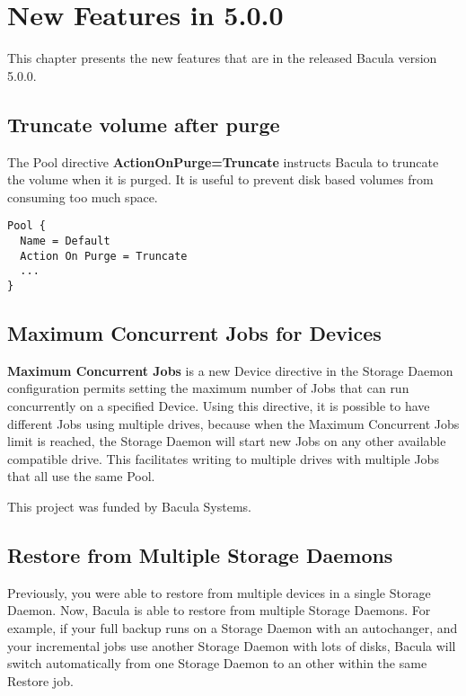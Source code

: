 \chapter{New Features in 5.0.0}
\label{NewFeaturesChapter}

This chapter presents the new features that are in the
released Bacula version 5.0.0.

\section{Truncate volume after purge}
\label{sec:actiononpurge}

The Pool directive \textbf{ActionOnPurge=Truncate} instructs Bacula to truncate
the volume when it is purged. It is useful to prevent disk based volumes from
consuming too much space. 

\begin{verbatim}
Pool {
  Name = Default
  Action On Purge = Truncate
  ...
}
\end{verbatim}

\section{Maximum Concurrent Jobs for Devices}
\label{sec:maximumconcurrentjobdevice}

{\bf Maximum Concurrent Jobs} is a new Device directive in the Storage
Daemon configuration permits setting the maximum number of Jobs that can
run concurrently on a specified Device.  Using this directive, it is
possible to have different Jobs using multiple drives, because when the
Maximum Concurrent Jobs limit is reached, the Storage Daemon will start new
Jobs on any other available compatible drive.  This facilitates writing to
multiple drives with multiple Jobs that all use the same Pool.

This project was funded by Bacula Systems.

\section{Restore from Multiple Storage Daemons}

Previously, you were able to restore from multiple devices in a single Storage
Daemon. Now, Bacula is able to restore from multiple Storage Daemons. For
example, if your full backup runs on a Storage Daemon with an autochanger, and
your incremental jobs use another Storage Daemon with lots of disks, Bacula
will switch automatically from one Storage Daemon to an other within the same
Restore job.

